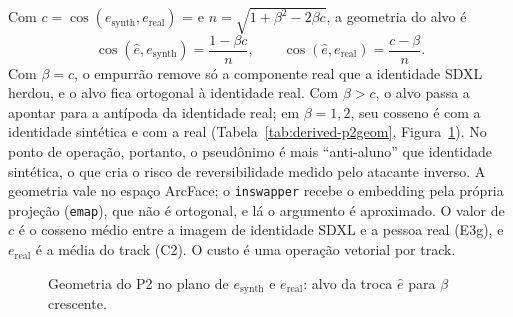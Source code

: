 Com $c = \cos(e_{\mathrm{synth}}, e_{\mathrm{real}})$ =  e $n = \sqrt{1 + \beta^2 - 2\beta c}$, a geometria do alvo é
\begin{equation}
\cos(\hat e, e_{\mathrm{synth}}) = \frac{1 - \beta c}{n},\qquad \cos(\hat e, e_{\mathrm{real}}) = \frac{c - \beta}{n}.
\end{equation}
Com $\beta = c$, o empurrão remove só a componente real que a identidade SDXL herdou, e o alvo fica ortogonal à identidade real. Com $\beta > c$, o alvo passa a apontar para a antípoda da identidade real; em $\beta = 1{,}2$, seu cosseno é  com a identidade sintética e  com a real (Tabela~\ref{tab:derived-p2geom}, Figura~\ref{fig:p2geom}). No ponto de operação, portanto, o pseudônimo é mais ``anti-aluno'' que identidade sintética, o que cria o risco de reversibilidade medido pelo atacante inverso. A geometria vale no espaço ArcFace; o \texttt{inswapper} recebe o embedding pela própria projeção (\texttt{emap}), que não é ortogonal, e lá o argumento é aproximado. O valor de $c$ é o cosseno médio entre a imagem de identidade SDXL e a pessoa real (E3g), e $e_{\mathrm{real}}$ é a média do track (C2). O custo é uma operação vetorial por track.

\begin{figure}[ht]\centering
\caption{Geometria do P2 no plano de $e_{\mathrm{synth}}$ e $e_{\mathrm{real}}$: alvo da troca $\hat e$ para $\beta$ crescente.}
\label{fig:p2geom}
\end{figure}

